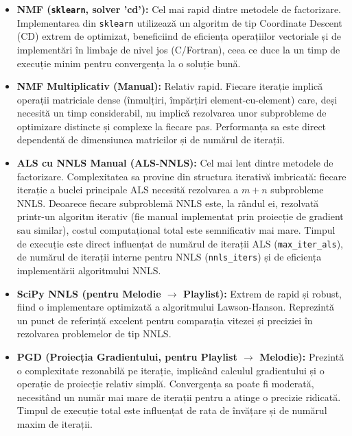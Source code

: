 \documentclass[12pt,a4paper]{article}
\begin{document}
	\begin{itemize}
		\item \textbf{NMF (\texttt{sklearn}, solver 'cd'):}
		    Cel mai rapid dintre metodele de factorizare. Implementarea din \texttt{sklearn} utilizează un algoritm de tip Coordinate Descent (CD) extrem de optimizat, beneficiind de eficiența operațiilor vectoriale și de implementări în limbaje de nivel jos (C/Fortran), ceea ce duce la un timp de execuție minim pentru convergența la o soluție bună.

		\item \textbf{NMF Multiplicativ (Manual):}
		    Relativ rapid. Fiecare iterație implică operații matriciale dense (înmulțiri, împărțiri element-cu-element) care, deși necesită un timp considerabil, nu implică rezolvarea unor subprobleme de optimizare distincte și complexe la fiecare pas. Performanța sa este direct dependentă de dimensiunea matricilor și de numărul de iterații.

		\item \textbf{ALS cu NNLS Manual (ALS-NNLS):}
		    Cel mai lent dintre metodele de factorizare. Complexitatea sa provine din structura iterativă imbricată: fiecare iterație a buclei principale ALS necesită rezolvarea a $m+n$ subprobleme NNLS. Deoarece fiecare subproblemă NNLS este, la rândul ei, rezolvată printr-un algoritm iterativ (fie manual implementat prin proiecție de gradient sau similar), costul computațional total este semnificativ mai mare. Timpul de execuție este direct influențat de numărul de iterații ALS (\texttt{max\_iter\_als}), de numărul de iterații interne pentru NNLS (\texttt{nnls\_iters}) și de eficiența implementării algoritmului NNLS.


		\item \textbf{SciPy NNLS (pentru Melodie $\rightarrow$ Playlist):}
		    Extrem de rapid și robust, fiind o implementare optimizată a algoritmului Lawson-Hanson. Reprezintă un punct de referință excelent pentru comparația vitezei și preciziei în rezolvarea problemelor de tip NNLS. 

		\item \textbf{PGD (Proiecția Gradientului, pentru Playlist $\rightarrow$ Melodie):}
		    Prezintă o complexitate rezonabilă pe iterație, implicând calculul gradientului și o operație de proiecție relativ simplă. Convergența sa poate fi moderată, necesitând un număr mai mare de iterații pentru a atinge o precizie ridicată. Timpul de execuție total este influențat de rata de învățare și de numărul maxim de iterații.


\end{itemize}
\end{document}
